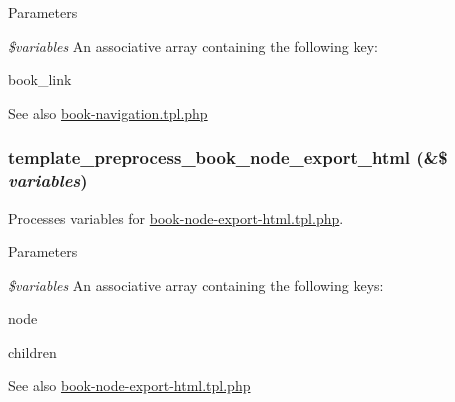 \begin{DoxyParams}{Parameters}
\item[{\em \$variables}]An associative array containing the following key:
\begin{DoxyItemize}
\item book\_\-link
\end{DoxyItemize}\end{DoxyParams}
\begin{DoxySeeAlso}{See also}
\hyperlink{book-navigation_8tpl_8php}{book-\/navigation.tpl.php} 
\end{DoxySeeAlso}
\hypertarget{book_8module_acff8a6be50ab7378ef08da71ddd6b656}{
\subsubsection[{template\_\-preprocess\_\-book\_\-node\_\-export\_\-html}]{\setlength{\rightskip}{0pt plus 5cm}template\_\-preprocess\_\-book\_\-node\_\-export\_\-html (\&\$ {\em variables})}}
\label{book_8module_acff8a6be50ab7378ef08da71ddd6b656}
Processes variables for \hyperlink{book-node-export-html_8tpl_8php}{book-\/node-\/export-\/html.tpl.php}.


\begin{DoxyParams}{Parameters}
\item[{\em \$variables}]An associative array containing the following keys:
\begin{DoxyItemize}
\item node
\item children
\end{DoxyItemize}\end{DoxyParams}
\begin{DoxySeeAlso}{See also}
\hyperlink{book-node-export-html_8tpl_8php}{book-\/node-\/export-\/html.tpl.php} 
\end{DoxySeeAlso}
